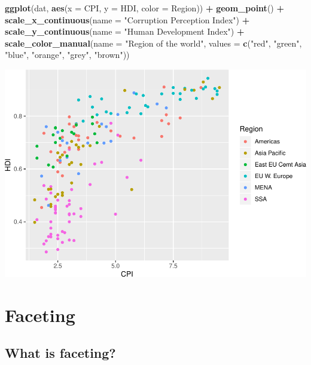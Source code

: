 \documentclass[
]{book}
\newenvironment{Shaded}{\begin{snugshade}}{\end{snugshade}}
\newcommand{\DataTypeTok}[1]{\textcolor[rgb]{0.13,0.29,0.53}{#1}}
\newcommand{\KeywordTok}[1]{\textcolor[rgb]{0.13,0.29,0.53}{\textbf{#1}}}
\newcommand{\NormalTok}[1]{#1}
\newcommand{\OperatorTok}[1]{\textcolor[rgb]{0.81,0.36,0.00}{\textbf{#1}}}
\newcommand{\StringTok}[1]{\textcolor[rgb]{0.31,0.60,0.02}{#1}}
\begin{document}
\begin{alert}
\begin{Shaded}
\begin{Highlighting}[]
\KeywordTok{ggplot}\NormalTok{(dat, }\KeywordTok{aes}\NormalTok{(}\DataTypeTok{x =}\NormalTok{ CPI, }\DataTypeTok{y =}\NormalTok{ HDI, }\DataTypeTok{color =}\NormalTok{ Region)) }\OperatorTok{+}
\StringTok{  }\KeywordTok{geom\_point}\NormalTok{() }\OperatorTok{+}
\StringTok{  }\KeywordTok{scale\_x\_continuous}\NormalTok{(}\DataTypeTok{name =} \StringTok{"Corruption Perception Index"}\NormalTok{) }\OperatorTok{+}
\StringTok{  }\KeywordTok{scale\_y\_continuous}\NormalTok{(}\DataTypeTok{name =} \StringTok{"Human Development Index"}\NormalTok{) }\OperatorTok{+}
\StringTok{  }\KeywordTok{scale\_color\_manual}\NormalTok{(}\DataTypeTok{name =} \StringTok{"Region of the world"}\NormalTok{,}
                     \DataTypeTok{values =} \KeywordTok{c}\NormalTok{(}\StringTok{"red"}\NormalTok{, }\StringTok{"green"}\NormalTok{, }\StringTok{"blue"}\NormalTok{, }\StringTok{"orange"}\NormalTok{, }\StringTok{"grey"}\NormalTok{, }\StringTok{"brown"}\NormalTok{))}
\end{Highlighting}
\end{Shaded}

\includegraphics{R/Rgraphics/figures/unnamed-chunk-207-1.pdf}

\end{alert}

\hypertarget{faceting}{%
\section{Faceting}\label{faceting}}

\hypertarget{what-is-faceting}{%
\subsection{What is faceting?}\label{what-is-faceting}}
\end{document}
